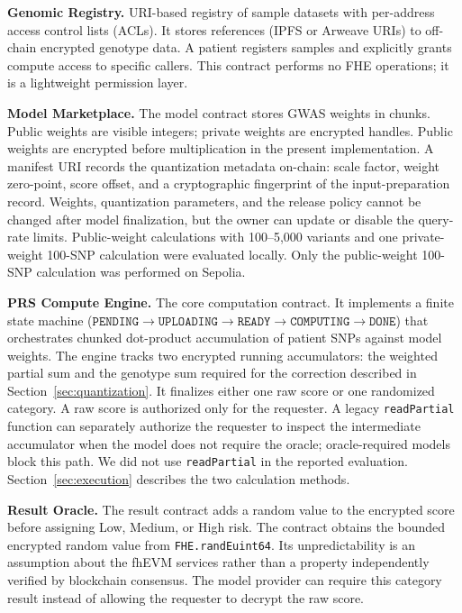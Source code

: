 \documentclass[10pt]{article}
\begin{document}
\textbf{Genomic Registry.}
URI-based registry of sample datasets with per-address access control lists (ACLs).
It stores references (IPFS or Arweave URIs) to off-chain encrypted genotype data.  A
patient registers samples and explicitly grants compute access to specific callers.
This contract performs no FHE operations; it is a lightweight permission layer.

\textbf{Model Marketplace.}
The model contract stores GWAS weights in chunks.  Public weights are visible
integers; private weights are encrypted handles.  Public weights are encrypted before
multiplication in the present implementation.  A manifest URI records the quantization
metadata on-chain: scale factor, weight zero-point, score offset, and a cryptographic
fingerprint of the input-preparation record.  Weights, quantization parameters, and the release policy cannot be changed after
model finalization, but the owner can update or disable the query-rate limits.  Public-weight calculations with
100--5,000 variants and one private-weight 100-SNP calculation were evaluated locally.
Only the public-weight 100-SNP calculation was performed on Sepolia.

\textbf{PRS Compute Engine.}
The core computation contract.  It implements a finite state machine
($\texttt{PENDING}\!\to\!\texttt{UPLOADING}\!\to\!\texttt{READY}\!\to\!\texttt{COMPUTING}\!\to\!\texttt{DONE}$)
that orchestrates chunked dot-product accumulation of patient SNPs against model
weights.  The engine tracks two encrypted running accumulators: the weighted partial
sum and the genotype sum required for the correction described in
Section~\ref{sec:quantization}.  It finalizes either one raw score or one randomized
category.  A raw score is authorized only
for the requester.  A legacy \texttt{readPartial} function can separately authorize the
requester to inspect the intermediate accumulator when the model does not require the
oracle; oracle-required models block this path.  We did not use \texttt{readPartial} in the
reported evaluation.  Section~\ref{sec:execution} describes the two calculation methods.

\textbf{Result Oracle.}
The result contract adds a random value to the encrypted score before assigning Low,
Medium, or High risk.
The contract obtains the bounded encrypted random value from \texttt{FHE.randEuint64}.
Its unpredictability is an assumption about the fhEVM services rather than a property
independently verified by blockchain consensus.
The model provider can require this category result instead of allowing the requester to
decrypt the raw score.
\end{document}
